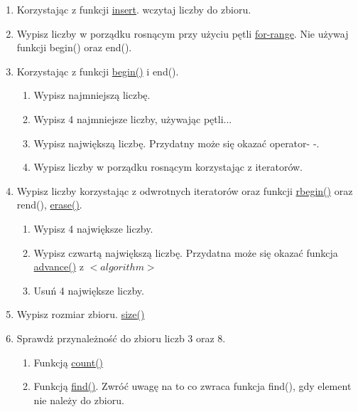 \documentclass[paper=a4, fontsize=11pt]{article}
\begin{document}
\begin{enumerate}
\item Korzystając z funkcji \href{http://www.cplusplus.com/reference/set/set/insert/}{insert}. wczytaj liczby do zbioru. 

\item Wypisz liczby w porządku rosnącym przy użyciu pętli \href{https://en.cppreference.com/w/cpp/language/range-based for loop}{for-range}. Nie używaj funkcji begin() oraz end().

\item Korzystając z funkcji \href{http://www.cplusplus.com/reference/set/set/begin/}{begin()} i end().
\begin{enumerate}

\item Wypisz najmniejszą liczbę.
\item Wypisz 4 najmniejsze liczby, używając pętli...
\item Wypisz największą liczbę. Przydatny może się okazać operator- -.
\item Wypisz liczby w porządku rosnącym korzystając z iteratorów.
\end{enumerate}

\item Wypisz liczby korzystając z odwrotnych iteratorów oraz funkcji
\href{http://www.cplusplus.com/reference/set/set/rbegin/}{rbegin()} oraz rend(), 
\href{http://www.cplusplus.com/reference/set/set/erase/}{erase()}.
\begin{enumerate}
\item Wypisz 4 największe liczby.
\item Wypisz czwartą największą liczbę. Przydatna może się okazać funkcja \href{https://en.cppreference.com/w/cpp/iterator/advance}{advance()} z $<algorithm>$
\item Usuń 4 największe liczby.
\end{enumerate}

\item Wypisz rozmiar zbioru. \href{http://www.cplusplus.com/reference/set/set/size/}{size()}
\item Sprawdż przynależność do zbioru liczb 3 oraz 8.
\begin{enumerate}
\item Funkcją \href{http://www.cplusplus.com/reference/set/set/count/}{count()}
\item Funkcją \href{http://www.cplusplus.com/reference/set/set/find/}{find()}. Zwróć uwagę na to co zwraca funkcja find(), gdy element nie należy do zbioru.


\end{enumerate}
\end{enumerate}
\end{document}

